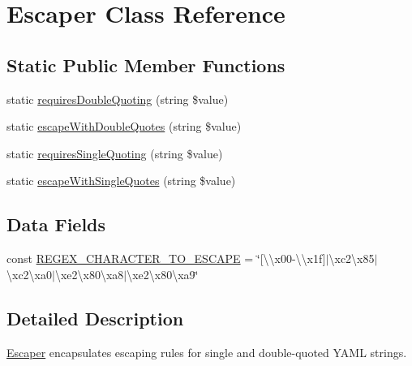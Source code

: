 \hypertarget{class_symfony_1_1_component_1_1_yaml_1_1_escaper}{}\section{Escaper Class Reference}
\label{class_symfony_1_1_component_1_1_yaml_1_1_escaper}
\subsection*{Static Public Member Functions}
\begin{DoxyCompactItemize}
\item 
static \mbox{\hyperlink{class_symfony_1_1_component_1_1_yaml_1_1_escaper_a27a91a29f75e7bab19ab1e9d9a571280}{requires\+Double\+Quoting}} (string \$value)
\item 
static \mbox{\hyperlink{class_symfony_1_1_component_1_1_yaml_1_1_escaper_acfaf5ef09521c38f06f9642e65437d9d}{escape\+With\+Double\+Quotes}} (string \$value)
\item 
static \mbox{\hyperlink{class_symfony_1_1_component_1_1_yaml_1_1_escaper_ad0f9c5f7d3716a41cc182af3129cb88e}{requires\+Single\+Quoting}} (string \$value)
\item 
static \mbox{\hyperlink{class_symfony_1_1_component_1_1_yaml_1_1_escaper_a1919aa59601bd0d1fd064052798a754a}{escape\+With\+Single\+Quotes}} (string \$value)
\end{DoxyCompactItemize}
\subsection*{Data Fields}
\begin{DoxyCompactItemize}
\item 
const \mbox{\hyperlink{class_symfony_1_1_component_1_1_yaml_1_1_escaper_a35ce88401a0b249e400659276c997046}{R\+E\+G\+E\+X\+\_\+\+C\+H\+A\+R\+A\+C\+T\+E\+R\+\_\+\+T\+O\+\_\+\+E\+S\+C\+A\+PE}} = \char`\"{}\mbox{[}\textbackslash{}\textbackslash{}x00-\/\textbackslash{}\textbackslash{}x1f\mbox{]}$\vert$\textbackslash{}xc2\textbackslash{}x85$\vert$\textbackslash{}xc2\textbackslash{}xa0$\vert$\textbackslash{}xe2\textbackslash{}x80\textbackslash{}xa8$\vert$\textbackslash{}xe2\textbackslash{}x80\textbackslash{}xa9\char`\"{}
\end{DoxyCompactItemize}


\subsection{Detailed Description}
\mbox{\hyperlink{class_symfony_1_1_component_1_1_yaml_1_1_escaper}{Escaper}} encapsulates escaping rules for single and double-\/quoted Y\+A\+ML strings.

